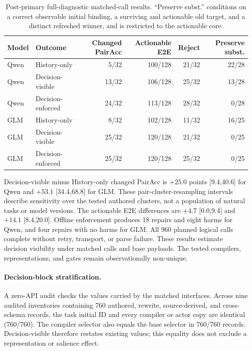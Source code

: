 \documentclass[10pt]{article}
\begin{document}
\begin{table}[H]
\centering
\small
\begin{tabular}{llrrrr}
\toprule
Model & Outcome & Changed PairAcc & Actionable E2E & Reject & Preserve subst. \\
\midrule
Qwen & History-only & 5/32 & 100/128 & 21/32 & 22/28 \\
Qwen & Decision-visible & 13/32 & 106/128 & 25/32 & 13/28 \\
Qwen & Decision-enforced & 24/32 & 113/128 & 28/32 & 0/28 \\
GLM & History-only & 8/32 & 102/128 & 11/32 & 16/25 \\
GLM & Decision-visible & 25/32 & 120/128 & 21/32 & 0/25 \\
GLM & Decision-enforced & 25/32 & 120/128 & 25/32 & 0/25 \\
\bottomrule
\end{tabular}
\caption{Post-primary full-diagnostic matched-call results. ``Preserve subst.'' conditions on a
correct observable initial binding, a surviving and actionable old target, and a distinct refreshed
winner, and is restricted to the actionable core.}
\label{tab:supp-full-matched-confirmation}
\end{table}

Decision-visible minus History-only changed PairAcc is $+25.0$ points [9.4,40.6] for Qwen and
$+53.1$ [34.4,68.8] for GLM. These pair-cluster-resampling intervals describe sensitivity over
the tested authored clusters, not a population of natural tasks or model versions. The actionable E2E differences are $+4.7$ [0.0,9.4] and
$+14.1$ [8.4,20.0]. Offline enforcement produces 18 repairs and eight harms for Qwen, and four
repairs with no harms for GLM. All 960 planned logical calls complete without retry, transport,
or parse failure. These results estimate decision visibility under matched calls and base payloads.
The tested compilers, representations, and gates remain observationally non-unique.


\paragraph{Decision-block stratification.}
A zero-API audit checks the values carried by the matched interfaces. Across nine audited
inventories containing 760 authored, rewrite, source-derived, and cross-schema records, the task
initial ID and every compiler or actor
copy are identical (760/760). The compiler selector also equals the base selector in 760/760
records. Decision-visible therefore restates existing values; this equality does not exclude a
representation or salience effect.
\end{document}

